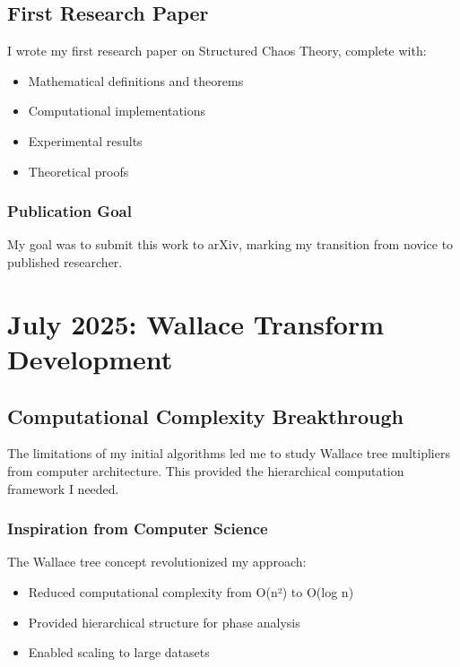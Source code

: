 \documentclass[12pt]{article}
\begin{document}
\subsection{First Research Paper}

I wrote my first research paper on Structured Chaos Theory, complete with:
\begin{itemize}
    \item Mathematical definitions and theorems
    \item Computational implementations
    \item Experimental results
    \item Theoretical proofs
\end{itemize}

\subsubsection{Publication Goal}

My goal was to submit this work to arXiv, marking my transition from novice to published researcher.

\section{July 2025: Wallace Transform Development}

\subsection{Computational Complexity Breakthrough}

The limitations of my initial algorithms led me to study Wallace tree multipliers from computer architecture. This provided the hierarchical computation framework I needed.

\subsubsection{Inspiration from Computer Science}

The Wallace tree concept revolutionized my approach:
\begin{itemize}
    \item Reduced computational complexity from O(n²) to O(log n)
    \item Provided hierarchical structure for phase analysis
    \item Enabled scaling to large datasets
\end{itemize}
\end{document}
